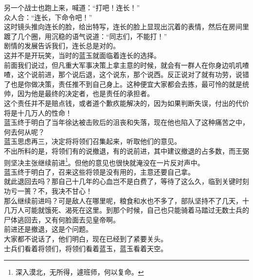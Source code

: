 \begin{multicols}{\theparacolNo}
另一个战士也跑上来，喊道：“打吧！连长！”\\

众人合：“连长，下命令吧！”\\

这时镜头推向连长的脸，给出特写，连长的脸上显现出沉着的表情，然后在房间里踱了几个圈，用沉稳的语气说道：“同志们，不能打！”\\

剧情的发展告诉我们，连长总是对的。\\

这并不是开玩笑，当时的蓝玉就面临着连长的选择。\\

前面我们说过，但凡重大军事决策上拿主意的时候，就会有一群人在你身边叽叽喳喳，这个说前进，那个说后退，这个说东，那个说西。反正说对了就有功劳，说错了也是你做决策，责任推不到自己身上。这种便宜大家都会去拣，最可怜的就是统帅，因为他是最终的决定者，也是责任的承担者。\\

这个责任并不是赔点钱，或者道个歉疚能解决的，因为如果判断失误，付出的代价将是十几万人的性命！\\

蓝玉终于明白了当年徐达被击败后的沮丧和失落，现在他也陷入了这种痛苦之中，何去何从呢？\\

蓝玉思虑再三，决定将将领们召集起来，听取他们的意见。\\

不出所料的是，将领们有的说撤退，有的说前进，其中建议撤退的占多数，而王弼则坚决主张继续前进\footnote{深入漠北，无所得，遽班师，何以复命。}。但他的意见也很快就淹没在一片反对声中。\\

蓝玉终于明白了，召来这些将领是没有用的，主意还要自己拿。\\

就此退回去吗？那自己十几年的心血岂不是白费了，等待了这么久，临到关键时刻功亏一篑？不，我决不甘心！\\

那么继续前进吗？可是敌人在哪里呢，粮食和水也不多了，部队坚持不了几天，十几万人可能就饿死、渴死在这里。到那个时候，自己也只能骑着马踏过无数士兵的尸体逃回去，又有何脸面去见皇帝啊。\\

前进还是撤退，这是个问题。\\

大家都不说话了，他们明白，现在已经到了紧要关头。\\

士兵们看着将领们，将领们看着蓝玉，蓝玉看着天空。\\


\end{multicols}
